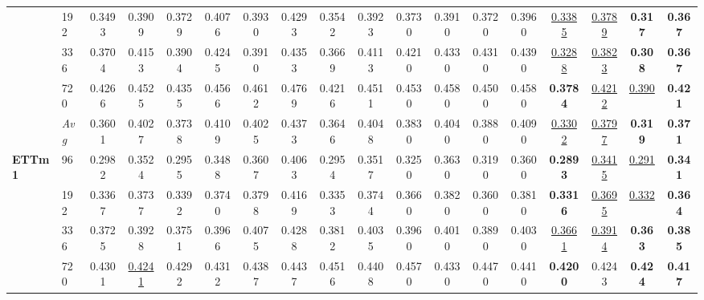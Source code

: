 \begin{tabular}{llcccccccccccccccc}
               & 192        &         0.3493 &         0.3909 &         0.3729 &         0.4076 &         0.3930 &         0.4293 &         0.3542 &         0.3923 &         0.3730 &         0.3910 &         0.3720 &         0.3960 & \underline{0.3385} & \underline{0.3789} & \textbf{0.317} & \textbf{0.367} \\
               & 336        &         0.3704 &         0.4153 &         0.3904 &         0.4245 &         0.3910 &         0.4353 &         0.3669 &         0.4113 &         0.4210 &         0.4330 &         0.4310 &         0.4390 & \underline{0.3288} & \underline{0.3823} & \textbf{0.308} & \textbf{0.367} \\
               & 720        &         0.4266 &         0.4525 &         0.4355 &         0.4566 &         0.4612 &         0.4769 &         0.4216 &         0.4511 &         0.4530 &         0.4580 &         0.4500 &         0.4580 & \textbf{0.3784} & \underline{0.4212} & \underline{0.390} & \textbf{0.421} \\
               & \textit{Avg} &         0.3601 &         0.4027 &         0.3738 &         0.4109 &         0.4025 &         0.4373 &         0.3646 &         0.4048 &         0.3830 &         0.4040 &         0.3880 &         0.4090 & \underline{0.3302} & \underline{0.3797} & \textbf{0.319} & \textbf{0.371} \\
\midrule
\textbf{ETTm1} & 96         &         0.2982 &         0.3524 &         0.2955 &         0.3488 &         0.3607 &         0.4063 &         0.2954 &         0.3517 &         0.3250 &         0.3630 &         0.3190 &         0.3600 & \textbf{0.2893} & \underline{0.3415} & \underline{0.291} & \textbf{0.341} \\
               & 192        &         0.3367 &         0.3737 &         0.3392 &         0.3740 &         0.3798 &         0.4169 &         0.3353 &         0.3744 &         0.3660 &         0.3820 &         0.3600 &         0.3810 & \textbf{0.3316} & \underline{0.3695} & \underline{0.332} & \textbf{0.364} \\
               & 336        &         0.3725 &         0.3928 &         0.3751 &         0.3966 &         0.4075 &         0.4288 &         0.3812 &         0.4035 &         0.3960 &         0.4010 &         0.3890 &         0.4030 & \underline{0.3661} & \underline{0.3914} & \textbf{0.363} & \textbf{0.385} \\
               & 720        &         0.4301 & \underline{0.4241} &         0.4292 &         0.4312 &         0.4387 &         0.4437 &         0.4516 &         0.4408 &         0.4570 &         0.4330 &         0.4470 &         0.4410 & \textbf{0.4200} &         0.4243 & \textbf{0.424} & \textbf{0.417} \\

\end{tabular}

